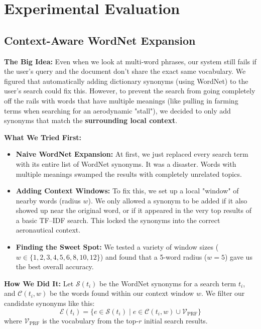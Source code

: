 \documentclass[runningheads]{llncs}
\begin{document}
\section{Experimental Evaluation}
\subsection{Context-Aware WordNet Expansion}

\textbf{The Big Idea:}
Even when we look at multi-word phrases, our system still fails if the user's query and the document don't share the exact same vocabulary. We figured that automatically adding dictionary synonyms (using WordNet) to the user's search could fix this. However, to prevent the search from going completely off the rails with words that have multiple meanings (like pulling in farming terms when searching for an aerodynamic "stall"), we decided to only add synonyms that match the \textbf{surrounding local context}.

\textbf{What We Tried First:}
\begin{itemize}
    \item \textbf{Naive WordNet Expansion:} At first, we just replaced every search term with its entire list of WordNet synonyms. It was a disaster. Words with multiple meanings swamped the results with completely unrelated topics.
    \item \textbf{Adding Context Windows:} To fix this, we set up a local "window" of nearby words (radius $w$). We only allowed a synonym to be added if it also showed up near the original word, or if it appeared in the very top results of a basic TF--IDF search. This locked the synonyms into the correct aeronautical context.
    \item \textbf{Finding the Sweet Spot:} We tested a variety of window sizes ($w \in \{1, 2, 3, 4, 5, 6, 8, 10, 12\}$) and found that a 5-word radius ($w = 5$) gave us the best overall accuracy.
\end{itemize}

\textbf{How We Did It:}
Let $\mathcal{S}(t_i)$ be the WordNet synonyms for a search term $t_i$, and $\mathcal{C}(t_i, w)$ be the words found within our context window $w$. We filter our candidate synonyms like this:
\begin{equation}
    \mathcal{E}(t_i) =
    \bigl\{ e \in \mathcal{S}(t_i) \;\big|\;
            e \in \mathcal{C}(t_i, w) \cup \mathcal{V}_{\text{PRF}}
    \bigr\}
\end{equation}
where $\mathcal{V}_{\text{PRF}}$ is the vocabulary from the top-$r$ initial search results. 
\end{document}

